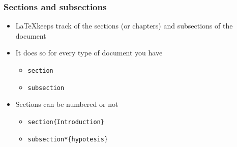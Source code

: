 \documentclass[10pt]{beamer}
\begin{document}
      \begin{frame}
        \frametitle{Sections and subsections}
      
      \begin{itemize}
        
        \item \LaTeX keeps track of the sections (or chapters) and subsections 
        of the document
        \item It does so for every type of document you have 
        
        \begin{itemize}
          \item \texttt{section}
          \item \texttt{subsection}
        \end{itemize}
        
        \item Sections can be numbered or not  
        
            \begin{itemize}
          \item \texttt{section\{Introduction\}}
          \item \texttt{subsection*\{hypotesis\}}
        \end{itemize}
        
        
      \end{itemize}
      
      
      \end{frame}
      
\end{document}
